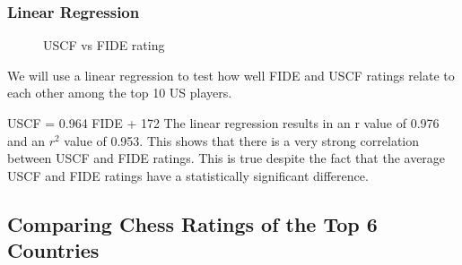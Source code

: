 \documentclass[12pt, titlepage]{article}
\begin{document}
\subsubsection{Linear Regression}
\begin{figure}[H]
\centering
{}
    \caption{USCF vs FIDE rating}
\end{figure}

We will use a linear regression to test how well FIDE and USCF ratings relate to each other among the top 10 US players.

USCF = 0.964 FIDE + 172
The linear regression results in an r value of 0.976 and an \(r^{2}\) value of 0.953. This shows that there is a very strong correlation between USCF and FIDE ratings. This is true despite the fact that the average USCF and FIDE ratings have a statistically significant difference.

\subsection{Comparing Chess Ratings of the Top 6 Countries}
\end{document}
